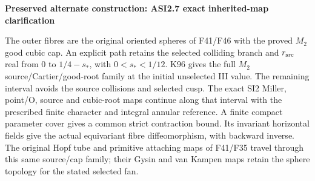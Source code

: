 \par\bigskip\noindent\textbf{Preserved alternate construction: ASI2.7 exact inherited-map clarification}\par
The outer fibres are the original
oriented spheres of F41/F46 with the
proved \(M_{2}\) good cubic cap. An explicit
path retains the selected colliding
branch and \(r_{\rm src}\) real from
\(0\) to \(1/4-s_*\), with
\(0<s_*<1/12\). K96 gives the full
\(M_{2}\) source/Cartier/good-root family at
the initial unselected III value.
The remaining interval avoids the
source collisions and selected cusp.
The exact SI2 Miller, point/O, source
and cubic-root maps continue along
that interval with the prescribed
finite character and integral
annular reference. A finite compact
parameter cover gives a common strict
contraction bound. Its invariant
horizontal fields give the actual
equivariant fibre diffeomorphism,
with backward inverse. The original
Hopf tube and primitive attaching
maps of F41/F35 travel through this
same source/cap family; their
Gysin and van Kampen maps retain
the sphere topology for the stated
selected fan.
